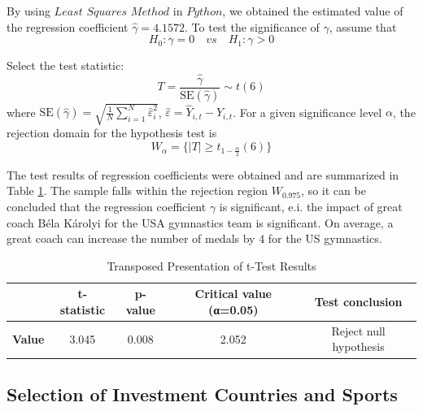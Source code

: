 \documentclass{mcmthesis}
\begin{document}
By using $Least$ $Squares$ $Method$ in $Python$, we obtained the estimated value of the regression coefficient $\hat{\gamma}=4.1572$. To test the significance of $\gamma$, assume that
\begin{equation*}
	H_0: \gamma=0 \quad vs \quad H_1: \gamma>0
\end{equation*}

Select the test statistic:
\begin{equation}
	T=\frac{ \hat{\gamma} }{ \text{SE}(\hat{\gamma}) } \sim t(6)
\end{equation}
where $\text{SE}(\hat{\gamma}) = \sqrt{ \frac{1}{N} \sum_{i=1}^{N} \hat{\varepsilon}_i^2 }$, $\hat{\varepsilon}=\hat{Y}_{i,t}-Y_{i,t}$. For a given significance level $\alpha$, the rejection domain for the hypothesis test is
\begin{equation}
	W_\alpha = \big\{ |T| \ge t_{1-\frac{\alpha}{2}}(6) \big\}
\end{equation}

The test results of regression coefficients were obtained and are summarized in Table \ref{table:great-coach-effect_t-test}. The sample falls within the rejection region $W_{0.975}$, so it can be concluded that the regression coefficient $\gamma$ is significant, e.i. the impact of great coach Béla Károlyi for the USA gymnastics team is significant. On average, a great coach can increase the number of medals by 4 for the US gymnastics.
\begin{table}[H]
	\centering
	\caption{Transposed Presentation of t-Test Results}
	\label{table:great-coach-effect_t-test}
	\begin{tabular}{lcccc}
		\toprule
		\rowcolor{red!10}
		& \textbf{t-statistic} & \textbf{p-value} & \textbf{Critical value (α=0.05)} & \textbf{Test conclusion} \\
		\midrule
		\rowcolor{white} %
		\textbf{Value} & 3.045 & 0.008 & 2.052 & Reject null hypothesis \\
		\bottomrule
	\end{tabular}
\end{table}






\subsection{Selection of Investment Countries and Sports}

\end{document}
